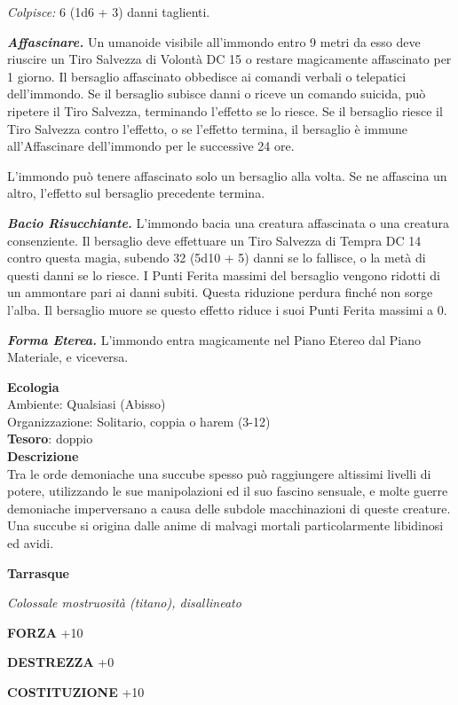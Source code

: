 \begin{multicols}{2}
	\textit{Colpisce:} 6 (1d6 + 3) danni taglienti.

	\textit{\textbf{Affascinare.}} Un umanoide visibile all'immondo entro 9 metri da esso deve riuscire un Tiro Salvezza di Volontà DC 15 o restare magicamente affascinato per 1 giorno. Il bersaglio affascinato obbedisce ai comandi verbali o telepatici dell'immondo. Se il bersaglio subisce danni o riceve un comando suicida, può ripetere il Tiro Salvezza, terminando l'effetto se lo riesce. Se il bersaglio riesce il Tiro Salvezza contro l'effetto, o se l'effetto termina, il bersaglio è immune all'Affascinare dell'immondo per le successive 24 ore.

	L'immondo può tenere affascinato solo un bersaglio alla volta. Se ne affascina un altro, l'effetto sul bersaglio precedente termina.

	\textit{\textbf{Bacio Risucchiante.}} L'immondo bacia una creatura affascinata o una creatura consenziente. Il bersaglio deve effettuare un Tiro Salvezza di Tempra DC 14 contro questa magia, subendo 32 (5d10 + 5) danni se lo fallisce, o la metà di questi danni se lo riesce. I Punti Ferita massimi del bersaglio vengono ridotti di un ammontare pari ai danni subiti. Questa riduzione perdura finché non sorge l'alba. Il bersaglio muore se questo effetto riduce i suoi Punti Ferita massimi a 0.

	\textit{\textbf{Forma Eterea.}} L'immondo entra magicamente nel Piano Etereo dal Piano Materiale, e viceversa.

	\textbf{Ecologia}\\
	Ambiente: Qualsiasi (Abisso)\\
	Organizzazione: Solitario, coppia o harem (3-12)\\
	\textbf{Tesoro}: doppio\\
	\textbf{Descrizione}\\
	Tra le orde demoniache una succube spesso può raggiungere altissimi livelli di potere, utilizzando le sue manipolazioni ed il suo fascino sensuale, e molte guerre demoniache imperversano a causa delle subdole macchinazioni di queste creature. Una succube si origina dalle anime di malvagi mortali particolarmente libidinosi ed avidi.


	\medskip{}\textbf{Tarrasque}

	\textit{Colossale mostruosità (titano), disallineato}

	\textbf{FORZA} +10

	\textbf{DESTREZZA} +0

	\textbf{COSTITUZIONE} +10


\end{multicols}
